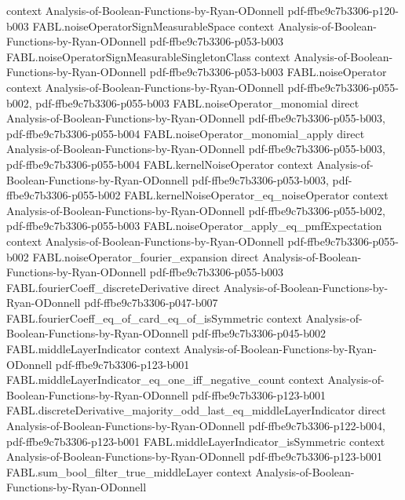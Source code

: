 \begin{theorem}
  {context}
  {Analysis-of-Boolean-Functions-by-Ryan-ODonnell}
  {pdf-ffbe9c7b3306-p120-b003}
\proofstep
  {FABL.noiseOperatorSignMeasurableSpace}
  {context}
  {Analysis-of-Boolean-Functions-by-Ryan-ODonnell}
  {pdf-ffbe9c7b3306-p053-b003}
\proofstep
  {FABL.noiseOperatorSignMeasurableSingletonClass}
  {context}
  {Analysis-of-Boolean-Functions-by-Ryan-ODonnell}
  {pdf-ffbe9c7b3306-p053-b003}
\proofstep
  {FABL.noiseOperator}
  {context}
  {Analysis-of-Boolean-Functions-by-Ryan-ODonnell}
  {pdf-ffbe9c7b3306-p055-b002,
    pdf-ffbe9c7b3306-p055-b003}
\proofstep
  {FABL.noiseOperator_monomial}
  {direct}
  {Analysis-of-Boolean-Functions-by-Ryan-ODonnell}
  {pdf-ffbe9c7b3306-p055-b003,
    pdf-ffbe9c7b3306-p055-b004}
\proofstep
  {FABL.noiseOperator_monomial_apply}
  {direct}
  {Analysis-of-Boolean-Functions-by-Ryan-ODonnell}
  {pdf-ffbe9c7b3306-p055-b003,
    pdf-ffbe9c7b3306-p055-b004}
\proofstep
  {FABL.kernelNoiseOperator}
  {context}
  {Analysis-of-Boolean-Functions-by-Ryan-ODonnell}
  {pdf-ffbe9c7b3306-p053-b003,
    pdf-ffbe9c7b3306-p055-b002}
\proofstep
  {FABL.kernelNoiseOperator_eq_noiseOperator}
  {context}
  {Analysis-of-Boolean-Functions-by-Ryan-ODonnell}
  {pdf-ffbe9c7b3306-p055-b002,
    pdf-ffbe9c7b3306-p055-b003}
\proofstep
  {FABL.noiseOperator_apply_eq_pmfExpectation}
  {context}
  {Analysis-of-Boolean-Functions-by-Ryan-ODonnell}
  {pdf-ffbe9c7b3306-p055-b002}
\proofstep
  {FABL.noiseOperator_fourier_expansion}
  {direct}
  {Analysis-of-Boolean-Functions-by-Ryan-ODonnell}
  {pdf-ffbe9c7b3306-p055-b003}
\proofstep
  {FABL.fourierCoeff_discreteDerivative}
  {direct}
  {Analysis-of-Boolean-Functions-by-Ryan-ODonnell}
  {pdf-ffbe9c7b3306-p047-b007}
\proofstep
  {FABL.fourierCoeff_eq_of_card_eq_of_isSymmetric}
  {context}
  {Analysis-of-Boolean-Functions-by-Ryan-ODonnell}
  {pdf-ffbe9c7b3306-p045-b002}
\proofstep
  {FABL.middleLayerIndicator}
  {context}
  {Analysis-of-Boolean-Functions-by-Ryan-ODonnell}
  {pdf-ffbe9c7b3306-p123-b001}
\proofstep
  {FABL.middleLayerIndicator_eq_one_iff_negative_count}
  {context}
  {Analysis-of-Boolean-Functions-by-Ryan-ODonnell}
  {pdf-ffbe9c7b3306-p123-b001}
\proofstep
  {FABL.discreteDerivative_majority_odd_last_eq_middleLayerIndicator}
  {direct}
  {Analysis-of-Boolean-Functions-by-Ryan-ODonnell}
  {pdf-ffbe9c7b3306-p122-b004,
    pdf-ffbe9c7b3306-p123-b001}
\proofstep
  {FABL.middleLayerIndicator_isSymmetric}
  {context}
  {Analysis-of-Boolean-Functions-by-Ryan-ODonnell}
  {pdf-ffbe9c7b3306-p123-b001}
\proofstep
  {FABL.sum_bool_filter_true_middleLayer}
  {context}
  {Analysis-of-Boolean-Functions-by-Ryan-ODonnell}

\end{theorem}
